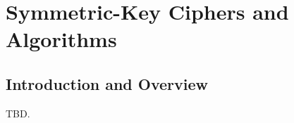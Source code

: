 \chapter{Symmetric-Key Ciphers and Algorithms}
\label{cskc0}

\section{Introduction and Overview}
\label{cskc0:siov0}

TBD.

